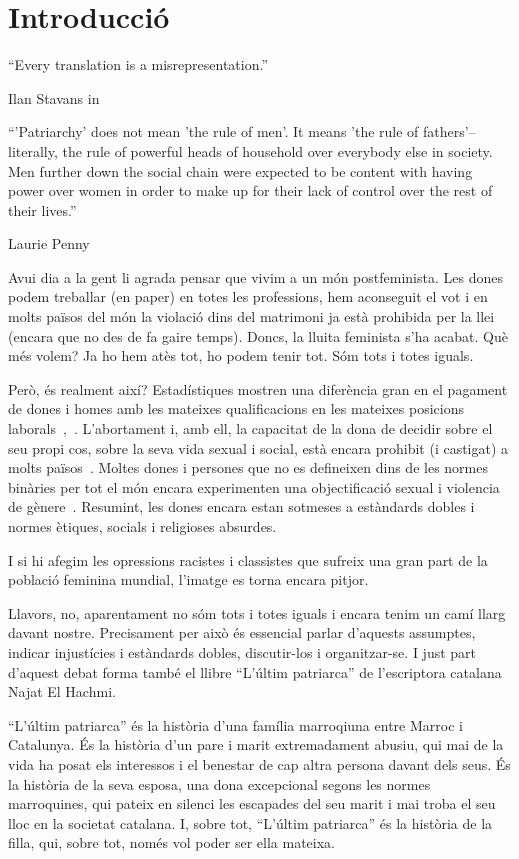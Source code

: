 \section{Introducció}

\epigraph{``Every translation is a misrepresentation.''}{Ilan Stavans in~\autocite{Albin2005}}
\epigraph{``'Patriarchy' does not mean 'the rule of men'. It means 'the rule of fathers'--literally, the rule of powerful heads of household over everybody else in society. Men further down the social chain were expected to be content with having power over women in order to make up for their lack of control over the rest of their lives.''}{Laurie Penny~\autocite[69]{Penny2014}}

Avui dia a la gent li agrada pensar que vivim a un món postfeminista.
Les dones podem treballar (en paper) en totes les professions, hem aconseguit el vot i en molts països del món la violació dins del matrimoni ja està prohibida per la llei (encara que no des de fa gaire temps).
Doncs, la lluita feminista s'ha acabat.
Què més volem?
Ja ho hem atès tot, ho podem tenir tot.
Sóm tots i totes iguals.

Però, és realment així?
Estadístiques mostren una diferència gran en el pagament de dones i homes amb les mateixes qualificacions en les mateixes posicions laborals~\autocite{EU2014},~\autocite{MDBGH2012}.
L'abortament i, amb ell, la capacitat de la dona de decidir sobre el seu propi cos, sobre la seva vida sexual i social, està encara prohibit (i castigat) a molts països~\autocite{UN2013}.
Moltes dones i persones que no es defineixen dins de les normes binàries per tot el món encara experimenten una objectificació sexual i violencia de gènere~\autocite{WHO2016}.
Resumint, les dones encara estan sotmeses a estàndards dobles i normes ètiques, socials i religioses absurdes.

I si hi afegim les opressions racistes i classistes que sufreix una gran part de la població feminina mundial, l'imatge es torna encara pitjor.

Llavors, no, aparentament no sóm tots i totes iguals i encara tenim un camí llarg davant nostre.
Precisament per això és essencial parlar d'aquests assumptes, indicar injustícies i estàndards dobles, discutir-los i organitzar-se.
I just part d'aquest debat forma també el llibre ``L'últim patriarca'' de l'escriptora catalana Najat El Hachmi.

``L'últim patriarca'' és la història d'una família marroqiuna entre Marroc i Catalunya.
És la història d'un pare i marit extremadament abusiu, qui mai de la vida ha posat els interessos i el benestar de cap altra persona davant dels seus.
És la història de la seva esposa, una dona excepcional segons les normes marroquines, qui pateix en silenci les escapades del seu marit i mai troba el seu lloc en la societat catalana.
I, sobre tot, ``L'últim patriarca'' és la història de la filla, qui, sobre tot, només vol poder ser ella mateixa.

